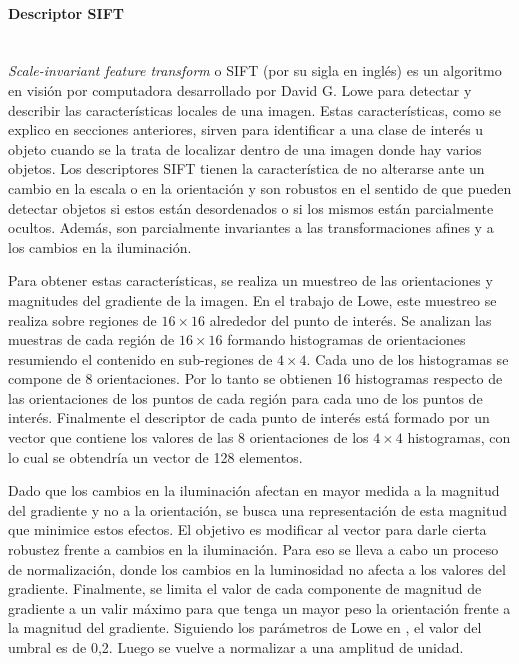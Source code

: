 \paragraph{Descriptor SIFT} ~\\

	\textit{Scale-invariant feature transform} o SIFT (por su sigla en inglés) es un algoritmo en visión por computadora desarrollado por David G. Lowe \cite{LoweDavid04} para detectar y describir las características locales de una imagen. Estas características, como se explico en secciones anteriores, sirven para identificar a una clase de interés u objeto cuando se la trata de localizar dentro de una imagen donde hay varios objetos. Los descriptores SIFT tienen la característica de no alterarse ante un cambio en la escala o en la orientación y son robustos en el sentido de que pueden detectar objetos si estos están desordenados o si los mismos están parcialmente ocultos. Además, son parcialmente invariantes a las transformaciones afines y a los cambios en la iluminación.
		
	Para obtener estas características, se realiza un muestreo de las orientaciones y magnitudes del gradiente de la imagen. En el trabajo de Lowe, este muestreo se realiza sobre regiones de $16 \times 16$ alrededor del punto de interés. Se analizan las muestras de cada región de $16 \times 16$ formando histogramas de orientaciones resumiendo el contenido en sub-regiones de $4 \times 4$. Cada uno de los histogramas se compone de 8 orientaciones. Por lo tanto se obtienen 16 histogramas respecto de las orientaciones de los puntos de cada región para cada uno de los puntos de interés. Finalmente el descriptor de cada punto de interés está formado por un vector que contiene los valores de las 8 orientaciones de los $4 \times 4$ histogramas, con lo cual se obtendría un vector de 128 elementos.

	Dado que los cambios en la iluminación afectan en mayor medida a la magnitud del gradiente y no a la orientación, se busca una representación de esta magnitud que minimice estos efectos. El objetivo es modificar al vector para darle cierta robustez frente a cambios en la iluminación. Para eso se lleva a cabo un proceso de normalización, donde los cambios en la luminosidad no afecta a los valores del gradiente. Finalmente, se limita el valor de cada componente de magnitud de gradiente a un valir máximo para que tenga un mayor peso la orientación frente a la magnitud del gradiente. Siguiendo los parámetros de Lowe en \cite{LoweDavid04}, el valor del umbral es de 0,2. Luego se vuelve a normalizar a una amplitud de unidad.

	
	